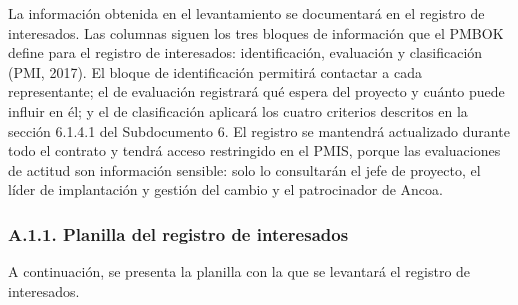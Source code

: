 \documentclass[11pt]{article}
\begin{document}
La información obtenida en el levantamiento se documentará en el registro de interesados. Las columnas siguen los tres bloques de información que el PMBOK define para el registro de interesados: identificación, evaluación y clasificación (PMI, 2017). El bloque de identificación permitirá contactar a cada representante; el de evaluación registrará qué espera del proyecto y cuánto puede influir en él; y el de clasificación aplicará los cuatro criterios descritos en la sección 6.1.4.1 del Subdocumento 6. El registro se mantendrá actualizado durante todo el contrato y tendrá acceso restringido en el PMIS, porque las evaluaciones de actitud son información sensible: solo lo consultarán el jefe de proyecto, el líder de implantación y gestión del cambio y el patrocinador de Ancoa.

\clearpage
\subsubsection{A.1.1. Planilla del registro de interesados}\label{a-1-1-planilla-del-registro-de-interesados}

A continuación, se presenta la planilla con la que se levantará el registro de interesados.
\end{document}
